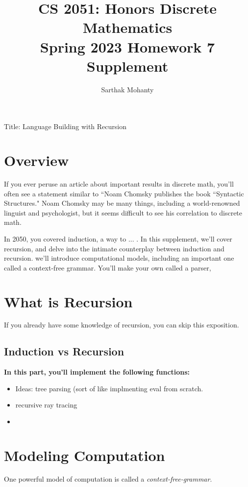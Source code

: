 \documentclass{article}
\title{\vspace{-1cm}CS 2051: Honors Discrete Mathematics \\Spring 2023 Homework 7 Supplement}
\author{Sarthak Mohanty }
\date{}
\begin{document}
\maketitle


Title: Language Building with Recursion

\section*{Overview}

If you ever peruse an article about important results in discrete math, you'll often see a statement similar to ``Noam Chomsky publishes the book “Syntactic Structures."  Noam Chomsky may be many things, including a world-renowned linguist and psychologist, but it seems difficult to see his correlation to discrete math.

In 2050, you covered induction, a way to ... . In this supplement, we'll cover recursion, and delve into the intimate counterplay between induction and recursion. we'll introduce computational models, including an important one called a context-free grammar. You'll make your own called a parser,

\section*{What is Recursion}

If you already have some knowledge of recursion, you can skip this exposition.
\subsection*{Induction vs Recursion}


\begin{tcolorbox}[enhanced,interior style={top color=Dandelion!20,bottom color=Dandelion!30}]
    \textbf{In this part, you'll implement the following functions:}
    \begin{itemize}
        \item Ideas: tree parsing (sort of like implmenting eval from scratch.
        \item recursive ray tracing 
        \item 
    \end{itemize}
\end{tcolorbox}


\section*{Modeling Computation}
    One powerful model of computation is called a \textit{context-free-grammar}. 
\end{document}
